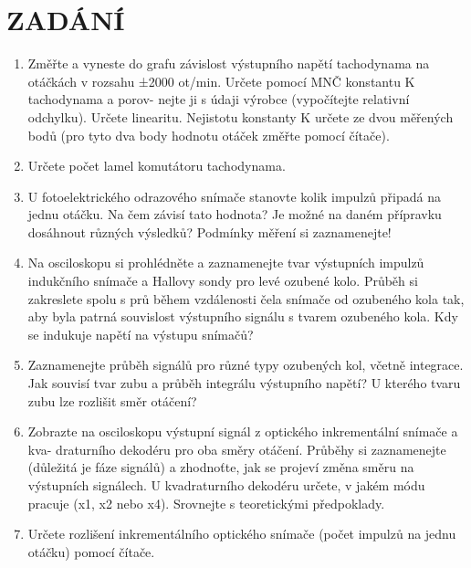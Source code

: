 \documentclass{protokol}
\begin{document}
\section{ZADÁNÍ}\label{kap:zadani}
    \begin{enumerate}
        \item   Změřte a vyneste do grafu závislost výstupního napětí tachodynama na otáčkách
                v rozsahu ±2000 ot/min. Určete pomocí MNČ konstantu K tachodynama a porov-
                nejte ji s údaji výrobce (vypočítejte relativní odchylku). Určete linearitu. Nejistotu
                konstanty K určete ze dvou měřených bodů (pro tyto dva body hodnotu otáček
                změřte pomocí čítače).

        \item   Určete počet lamel komutátoru tachodynama.
                
        \item   U fotoelektrického odrazového snímače stanovte kolik impulzů připadá na jednu
                otáčku. Na čem závisí tato hodnota? Je možné na daném přípravku dosáhnout
                různých výsledků? Podmínky měření si zaznamenejte!
        
        \item   Na osciloskopu si prohlédněte a zaznamenejte tvar výstupních impulzů indukčního
                snímače a Hallovy sondy pro levé ozubené kolo. Průběh si zakreslete spolu s prů
                během vzdálenosti čela snímače od ozubeného kola tak, aby byla patrná souvislost
                výstupního signálu s tvarem ozubeného kola. Kdy se indukuje napětí na výstupu
                snímačů?

        \item   Zaznamenejte průběh signálů pro různé typy ozubených kol, včetně integrace. Jak
                souvisí tvar zubu a průběh integrálu výstupního napětí? U kterého tvaru zubu lze
                rozlišit směr otáčení?

        \item   Zobrazte na osciloskopu výstupní signál z optického inkrementální snímače a kva-
                draturního dekodéru pro oba směry otáčení. Průběhy si zaznamenejte (důležitá je
                fáze signálů) a zhodnoťte, jak se projeví změna směru na výstupních signálech. U
                kvadraturního dekodéru určete, v jakém módu pracuje (x1, x2 nebo x4). Srovnejte
                s teoretickými předpoklady.
                
        \item   Určete rozlišení inkrementálního optického snímače (počet impulzů na jednu otáčku)
                pomocí čítače.
                

\end{enumerate}
\end{document}

